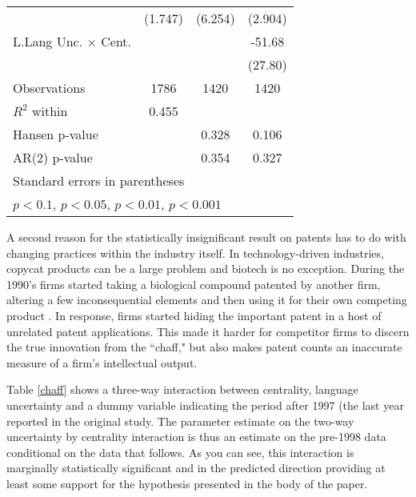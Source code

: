 \begin{table}
\begin{center}
{\begin{tabular}{l*{3}{c}}
                    &     (1.747)         &     (6.254)         &     (2.904)         \\
L.Lang Unc. $\times$ Cent.&                     &                     &      -51.68\sym{+}  \\
                    &                     &                     &     (27.80)         \\
\hline
Observations        &        1786         &        1420         &        1420         \\
$R^2$ within               &       0.455         &                     &                     \\
Hansen p-value             &                     &       0.328         &       0.106         \\
AR(2) p-value                &                     &       0.354         &       0.327         \\
\hline\hline
\multicolumn{4}{l}{\footnotesize Standard errors in parentheses}\\
\multicolumn{4}{l}{\footnotesize \sym{+} \(p<0.1\), \sym{*} \(p<0.05\), \sym{**} \(p<0.01\), \sym{***} \(p<0.001\)}\\
\end{tabular}
}
\end{center}
\end{table}

A second reason for the statistically insignificant result on patents has to do with changing practices within the industry itself. In technology-driven industries, copycat products can be a large problem \citep{teece1986} and biotech is no exception. During the 1990's firms started taking a biological compound patented by another firm, altering a few inconsequential elements and then using it for their own competing product \citep{wolff2001}. In response, firms started hiding the important patent in a host of unrelated patent applications. This made it harder for competitor firms to discern the true innovation from the ``chaff," but also makes patent counts an inaccurate measure of a firm's intellectual output.

Table \ref{chaff} shows a three-way interaction between centrality, language uncertainty and a dummy variable indicating the period after 1997 (the last year reported in the original \citep{powell1999} study. The parameter estimate on the two-way uncertainty by centrality interaction is thus an estimate on the pre-1998 data conditional on the data that follows. As you can see, this interaction is marginally statistically significant and in the predicted direction providing at least some support for the hypothesis presented in the body of the paper.


